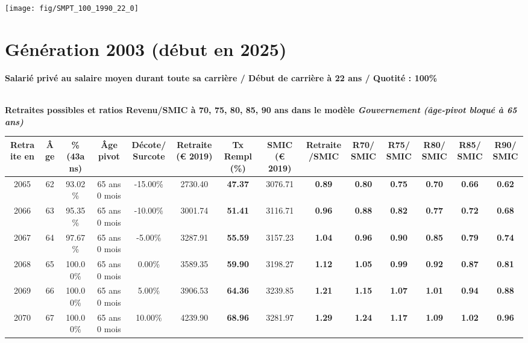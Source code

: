  \vspace{0.1cm} 

 {\hspace{-2.2cm}\texttt{[image: fig/SMPT\_100\_1990\_22\_0]}} 

\newpage 
 
\section{Génération 2003 (début en 2025)\label{SMPT_100_2003_22_0}} 
 
{\bf \noindent Salarié privé au salaire moyen durant toute sa carrière / Début de carrière à 22 ans / Quotité : 100\%}  ~ 

 ~\\{\bf \noindent Retraites possibles et ratios Revenu/SMIC à 70, 75, 80, 85, 90 ans dans le modèle \emph{Gouvernement (âge-pivot bloqué à 65 ans)}}  
 
\begin{adjustbox}{max width=\textwidth} 
\begin{tabular}[htb]{|c|c||c|c|c||c|c||c|c||c|c|c|c|c|} 
\hline 
 Retraite en &  Âge &  \%(43ans) &  Âge pivot &  Décote/Surcote &  Retraite (\euro{} 2019) &  Tx Rempl(\%) &  SMIC (\euro{} 2019) &  Retraite/SMIC &  R70/SMIC &  R75/SMIC &  R80/SMIC &  R85/SMIC &  R90/SMIC \\ 
\hline \hline 
 2065 &  62 &  93.02\% &  65 ans 0 mois &  -15.00\% &  2730.40 &  {\bf 47.37} &  3076.71 &  {\bf {\color{red} 0.89}} &  {\bf {\color{red} 0.80}} &  {\bf {\color{red} 0.75}} &  {\bf {\color{red} 0.70}} &  {\bf {\color{red} 0.66}} &  {\bf {\color{red} 0.62}} \\ 
\hline 
 2066 &  63 &  95.35\% &  65 ans 0 mois &  -10.00\% &  3001.74 &  {\bf 51.41} &  3116.71 &  {\bf {\color{red} 0.96}} &  {\bf {\color{red} 0.88}} &  {\bf {\color{red} 0.82}} &  {\bf {\color{red} 0.77}} &  {\bf {\color{red} 0.72}} &  {\bf {\color{red} 0.68}} \\ 
\hline 
 2067 &  64 &  97.67\% &  65 ans 0 mois &  -5.00\% &  3287.91 &  {\bf 55.59} &  3157.23 &  {\bf 1.04} &  {\bf {\color{red} 0.96}} &  {\bf {\color{red} 0.90}} &  {\bf {\color{red} 0.85}} &  {\bf {\color{red} 0.79}} &  {\bf {\color{red} 0.74}} \\ 
\hline 
 2068 &  65 &  100.00\% &  65 ans 0 mois &  0.00\% &  3589.35 &  {\bf 59.90} &  3198.27 &  {\bf 1.12} &  {\bf 1.05} &  {\bf {\color{red} 0.99}} &  {\bf {\color{red} 0.92}} &  {\bf {\color{red} 0.87}} &  {\bf {\color{red} 0.81}} \\ 
\hline 
 2069 &  66 &  100.00\% &  65 ans 0 mois &  5.00\% &  3906.53 &  {\bf 64.36} &  3239.85 &  {\bf 1.21} &  {\bf 1.15} &  {\bf 1.07} &  {\bf 1.01} &  {\bf {\color{red} 0.94}} &  {\bf {\color{red} 0.88}} \\ 
\hline 
 2070 &  67 &  100.00\% &  65 ans 0 mois &  10.00\% &  4239.90 &  {\bf 68.96} &  3281.97 &  {\bf 1.29} &  {\bf 1.24} &  {\bf 1.17} &  {\bf 1.09} &  {\bf 1.02} &  {\bf {\color{red} 0.96}} \\ 
\hline 
\hline 
\end{tabular} 
\end{adjustbox} 
 
